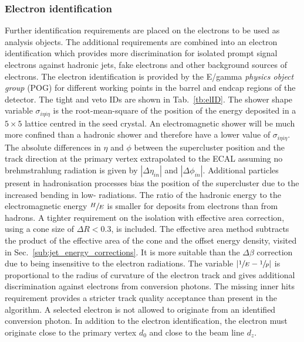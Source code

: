 \subsubsection{Electron identification}
\label{ssub:el}
Further identification requirements are placed on the \PF{} electrons to be used as analysis objects. 
The additional requirements are combined into an electron identification which provides more discrimination for isolated prompt signal electrons against hadronic jets, fake electrons and other background sources of electrons.
The electron identification is provided by the E/gamma \textit{physics object group} (POG) for different working points in the barrel and endcap regions of the detector.
The tight and veto IDs are shown in Tab.~\ref{tb:elID}. 
The shower shape variable $\sigma_{i\eta i\eta}$ is the root-mean-square of the position of the energy deposited in a $5\times5$ lattice centred in the seed crystal.
An electromagnetic shower will be much more confined than a hadronic shower and therefore have a lower value of $\sigma_{i\eta i\eta}$.
The absolute differences in $\eta$ and $\phi$ between the supercluster position and the track direction at the primary vertex extrapolated to the ECAL assuming no brehmstrahlung radiation is given by $|\Delta \eta_{in}|$ and $|\Delta \phi_{in}|$.
Additional particles present in hadronisation processes bias the position of the supercluster due to the increased bending in low-\pt{} radiations.
The ratio of the hadronic energy to the electromagnetic energy $\sfrac{H}{E}$ is smaller for deposits from electrons than from hadrons.
A tighter requirement on the \PF{} isolation with effective area correction, using a cone size of $\Delta R < 0.3$, is included.
The effective area method subtracts the product of the effective area of the cone and the offset energy density, visited in Sec.~\ref{sub:jet_energy_corrections}.
It is more suitable than the $\Delta\beta$ correction due to being insensitive to the electron radiations.
The variable $|\sfrac{1}{E}-\sfrac{1}{p}|$ is proportional to the radius of curvature of the electron track and gives additional discrimination against electrons from conversion photons.
The missing inner hits requirement provides a stricter track quality acceptance than present in the \PF algorithm.
A selected electron is not allowed to originate from an identified conversion photon.
In addition to the electron identification, the electron must originate close to the primary vertex $d_{0}$ and close to the beam line $d_{z}$.


